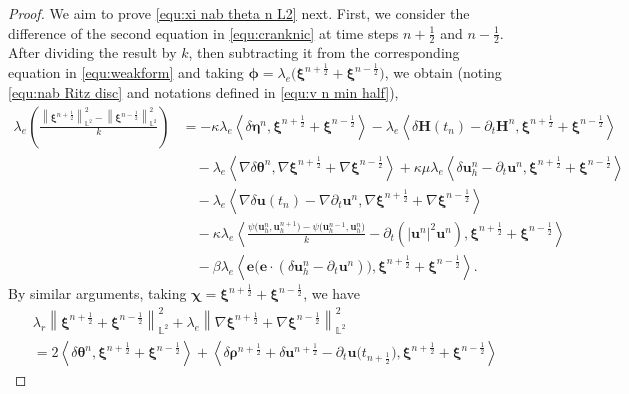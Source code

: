 \documentclass[11pt, reqno]{amsart}
\theoremstyle{definition}
\theoremstyle{remark}
\numberwithin{equation}{section}
\newcommand{\bff}{\boldsymbol}
\newcommand{\bb}{\mathbb}
\newcommand{\norm}[2]{\left\|{#1}\right\|_{#2}}
\newcommand{\inpro}[2]{\left\langle#1,#2\right\rangle}
\newcommand{\abs}[1]{\left|{#1}\right|}
\begin{document}
\begin{proof}
We aim to prove \eqref{equ:xi nab theta n L2} next.
First, we consider the difference of the second equation in \eqref{equ:cranknic} at time steps $n+\frac{1}{2}$ and $n-\frac{1}{2}$. After dividing the result by $k$, then subtracting it from the corresponding equation in \eqref{equ:weakform} and taking $\bff{\phi}= \lambda_e \big(\bff{\xi}^{n+\frac{1}{2}}+\bff{\xi}^{n-\frac{1}{2}}\big)$, we obtain (noting \eqref{equ:nab Ritz disc} and notations defined in \eqref{equ:v n min half}),
\begin{align}\label{equ:dt xi n half}
	\nonumber
	\lambda_e \left(\frac{\norm{\bff{\xi}^{n+\frac{1}{2}}}{\bb{L}^2}^2 - \norm{\bff{\xi}^{n-\frac{1}{2}}}{\bb{L}^2}^2}{k}\right) 
	&=
	-
	\kappa \lambda_e \inpro{\delta \bff{\eta}^n}{\bff{\xi}^{n+\frac{1}{2}}+\bff{\xi}^{n-\frac{1}{2}}}
	-
	\lambda_e \inpro{\delta \bff{H}(t_n) - \partial_t \bff{H}^n}{\bff{\xi}^{n+\frac{1}{2}}+\bff{\xi}^{n-\frac{1}{2}}}
	\\
	\nonumber
	&\quad
	-
	\lambda_e \inpro{\nabla \delta \bff{\theta}^n}{\nabla \bff{\xi}^{n+\frac{1}{2}}+\nabla \bff{\xi}^{n-\frac{1}{2}}}
	+
	\kappa\mu \lambda_e \inpro{\delta \bff{u}_h^n-\partial_t \bff{u}^n}{\bff{\xi}^{n+\frac{1}{2}}+ \bff{\xi}^{n-\frac{1}{2}}}
	\\
	\nonumber
	&\quad
	-
	\lambda_e \inpro{\nabla \delta \bff{u}(t_n) - \nabla\partial_t \bff{u}^n}{\nabla \bff{\xi}^{n+\frac{1}{2}}+ \nabla \bff{\xi}^{n-\frac{1}{2}}}
	\\
	&\quad
	-
	\kappa \lambda_e
	\inpro{\frac{\psi\big(\bff{u}_h^n,\bff{u}_h^{n+1}\big) - \psi\big(\bff{u}_h^{n-1}, \bff{u}_h^n\big)}{k} - \partial_t \left(\abs{\bff{u}^n}^2 \bff{u}^n\right)}{\bff{\xi}^{n+\frac{1}{2}}+ \bff{\xi}^{n-\frac{1}{2}}}
	\nonumber \\
	&\quad
	-
	\beta\lambda_e \inpro{\bff{e}\big(\bff{e}\cdot (\delta\bff{u}_h^n-\partial_t \bff{u}^n)\big)}{\bff{\xi}^{n+\frac12}+\bff{\xi}^{n-\frac12}}.
\end{align}
By similar arguments, taking $\bff{\chi}=\bff{\xi}^{n+\frac{1}{2}}+\bff{\xi}^{n-\frac{1}{2}}$, we have
\begin{align}\label{equ:xi nab xi disc}
	\nonumber
	&\lambda_r \norm{\bff{\xi}^{n+\frac{1}{2}}+\bff{\xi}^{n-\frac{1}{2}}}{\bb{L}^2}^2 
	+
	\lambda_e \norm{\nabla \bff{\xi}^{n+\frac{1}{2}}+\nabla \bff{\xi}^{n-\frac{1}{2}}}{\bb{L}^2}^2
	\\
	\nonumber
	&=
	2\inpro{\delta \bff{\theta}^n}{\bff{\xi}^{n+\frac{1}{2}}+\bff{\xi}^{n-\frac{1}{2}}}
	+
	\inpro{\delta \bff{\rho}^{n+\frac{1}{2}}+ \delta \bff{u}^{n+\frac{1}{2}} - \partial_t \bff{u}\big(t_{n+\frac{1}{2}}\big)}{\bff{\xi}^{n+\frac{1}{2}}+\bff{\xi}^{n-\frac{1}{2}}}

\end{align}
\end{proof}
\end{document}
